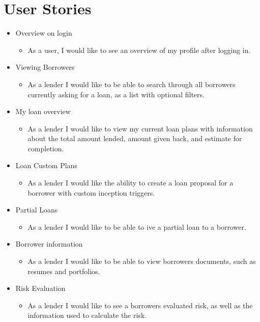 \newpage
\section{User Stories}

\begin{itemize}
	\item Overview on login
	\begin{itemize}
		\item As a user, I would like to see an overview of my profile after logging in.
	\end{itemize}

	\item Viewing Borrowers
	\begin{itemize}
		\item As a lender I would like to be able to search through all borrowers currently asking for a loan, as a list with optional filters.
	\end{itemize}

	\item My loan overview
	\begin{itemize}
		\item As a lender I would like to view my current loan plans with information about the total amount lended, amount given back, and estimate for completion.
	\end{itemize}

	\item Loan Custom Plans
	\begin{itemize}
		\item As a lender I would like the ability to create a loan proposal for a borrower with custom inception triggers.
	\end{itemize}

	\item Partial Loans
	\begin{itemize}
		\item As a lender I would like to be able to ive a partial loan to a borrower.
	\end{itemize}

	\item Borrower information
	\begin{itemize}
		\item As a lender I would like to be able to view borrowers documents, such as resumes and portfolios.
	\end{itemize}

	\item Risk Evaluation
	\begin{itemize}
		\item As a lender I would like to see a borrowers evaluated risk, as well as the information used to calculate the risk.
	\end{itemize}


\end{itemize}
